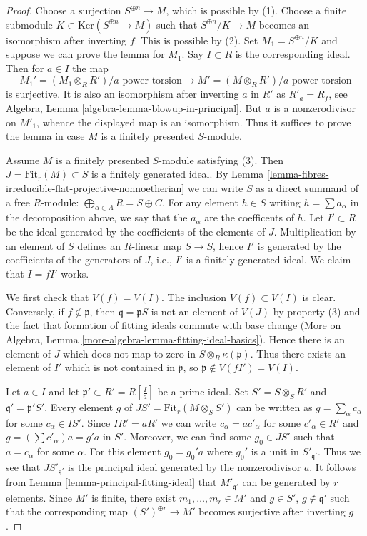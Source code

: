 \begin{proof}
Choose a surjection $S^{\oplus n} \to M$, which is possible by (1).
Choose a finite submodule $K \subset \text{Ker}(S^{\oplus n} \to M)$
such that $S^{\oplus n}/K \to M$ becomes an isomorphism after inverting $f$.
This is possible by (2). Set $M_1 = S^{\oplus n}/K$ and suppose we can
prove the lemma for $M_1$. Say $I \subset R$ is the corresponding ideal.
Then for $a \in I$ the map
$$
M_1' = (M_1 \otimes_R R')/a\text{-power torsion}
\longrightarrow
M' = (M \otimes_R R')/a\text{-power torsion}
$$
is surjective. It is also an isomorphism after inverting $a$ in $R'$
as $R'_a = R_f$, see Algebra, Lemma \ref{algebra-lemma-blowup-in-principal}.
But $a$ is a nonzerodivisor on $M'_1$, whence the displayed map is an
isomorphism. Thus it suffices to prove the lemma in case $M$ is a finitely
presented $S$-module.

\medskip\noindent
Assume $M$ is a finitely presented $S$-module satisfying (3).
Then $J = \text{Fit}_r(M) \subset S$ is a finitely generated ideal.
By Lemma \ref{lemma-fibres-irreducible-flat-projective-nonnoetherian}
we can write $S$ as a direct summand of a free
$R$-module: $\bigoplus_{\alpha \in A} R = S \oplus C$.
For any element $h \in S$ writing $h = \sum a_\alpha$ in the
decomposition above, we say that the $a_\alpha$ are the coefficents of $h$.
Let $I' \subset R$ be the ideal generated by the coefficients
of the elements of $J$. Multiplication by an element of $S$ defines
an $R$-linear map $S \to S$, hence $I'$ is generated by the coefficients
of the generators of $J$, i.e., $I'$ is a finitely generated ideal.
We claim that $I = fI'$ works.

\medskip\noindent
We first check that $V(f) = V(I)$. The inclusion $V(f) \subset V(I)$ is
clear. Conversely, if $f \not \in \mathfrak p$, then
$\mathfrak q =  \mathfrak p S$ is not an element of $V(J)$ by
property (3) and the fact that formation of fitting ideals commute with
base change
(More on Algebra, Lemma \ref{more-algebra-lemma-fitting-ideal-basics}).
Hence there is an
element of $J$ which does not map to zero in $S \otimes_R \kappa(\mathfrak p)$.
Thus there exists an element of $I'$ which is not contained in
$\mathfrak p$, so $\mathfrak p \not \in V(fI') = V(I)$.

\medskip\noindent
Let $a \in I$ and let $\mathfrak p' \subset R' = R[\frac{I}{a}]$ be
a prime ideal. Set $S' = S \otimes_S R'$ and
$\mathfrak q' = \mathfrak p'S'$. Every element $g$ of
$JS' = \text{Fit}_r(M \otimes_S S')$ can be
written as $g = \sum_\alpha c_\alpha$ for some $c_\alpha \in IS'$.
Since $IR' = aR'$ we can write $c_\alpha = ac'_\alpha$ for some
$c'_\alpha \in R'$ and $g = (\sum c'_\alpha)a = g'a$ in $S'$.
Moreover, we can find some $g_0 \in JS'$ such that $a = c_\alpha$ for some
$\alpha$. For this element $g_0 = g_0' a$ where $g_0'$ is a unit in
$S'_{\mathfrak q'}$. Thus we see that $JS'_{\mathfrak q'}$ is the
principal ideal generated by the nonzerodivisor $a$. It follows from
Lemma \ref{lemma-principal-fitting-ideal}
that $M'_{\mathfrak q'}$ can be generated by $r$ elements.
Since $M'$ is finite, there exist $m_1, \ldots, m_r \in M'$ and
$g \in S'$, $g \not \in \mathfrak q'$ such that the corresponding map
$(S')^{\oplus r} \to M'$ becomes surjective after inverting $g$.


\end{proof}
